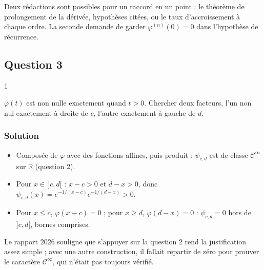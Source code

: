 \documentclass[11pt,a4paper]{article}
\providecommand{\tightlist}{\setlength{\itemsep}{0pt}\setlength{\parskip}{0pt}}
\newcommand{\equationajustee}[1]{%
  \sbox{\boiteequation}{$\displaystyle #1$}%
  \ifdim\wd\boiteequation>\linewidth
    \[\resizebox{\linewidth}{!}{\usebox{\boiteequation}}\]%
  \else
    \[#1\]%
  \fi}
\begin{document}
\begin{methode}

Deux rédactions sont possibles pour un raccord en un point : le théorème de prolongement de la dérivée, hypothèses citées, ou le taux d'accroissement à chaque ordre. La seconde demande de garder \(\varphi^{(n)}(0)=0\) dans l'hypothèse de récurrence.

\end{methode}

\hypertarget{question-3}{%
\subsection{Question 3}\label{question-3}}

\begin{indication}{1}

\(\varphi(t)\) est non nulle exactement quand \(t>0\). Chercher deux facteurs, l'un non nul exactement à droite de \(c\), l'autre exactement à gauche de \(d\).

\end{indication}

\hypertarget{solution-2}{%
\subsubsection{Solution}\label{solution-2}}

\equationajustee{\boxed{\psi_{c,d}(x)=\varphi(x-c)\,\varphi(d-x).}}

\begin{itemize}
\tightlist
\item
  Composée de \(\varphi\) avec des fonctions affines, puis produit : \(\psi_{c,d}\) est de classe \(\mathcal C^\infty\) sur \(\mathbb R\) (question 2).
\item
  Pour \(x\in\,]c,d[\) : \(x-c>0\) et \(d-x>0\), donc \(\psi_{c,d}(x)=e^{-1/(x-c)}e^{-1/(d-x)}>0\).
\item
  Pour \(x\le c\), \(\varphi(x-c)=0\) ; pour \(x\ge d\), \(\varphi(d-x)=0\) : \(\psi_{c,d}=0\) hors de \(]c,d[\), bornes comprises.
\end{itemize}

\begin{jury}

Le rapport 2026 souligne que s'appuyer sur la question 2 rend la justification assez simple ; avec une autre construction, il fallait repartir de zéro pour prouver le caractère \(\mathcal C^\infty\), qui n'était pas toujours vérifié.

\end{jury}
\end{document}
